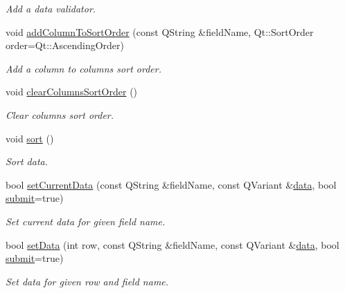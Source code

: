 \begin{DoxyCompactItemize}
\begin{DoxyCompactList}\small\item\em Add a data validator. \end{DoxyCompactList}\item 
void \hyperlink{classmdt_abstract_sql_table_controller_aa56e548973ffed3e01bd319bd7695101}{add\-Column\-To\-Sort\-Order} (const Q\-String \&field\-Name, Qt\-::\-Sort\-Order order=Qt\-::\-Ascending\-Order)
\begin{DoxyCompactList}\small\item\em Add a column to columns sort order. \end{DoxyCompactList}\item 
void \hyperlink{classmdt_abstract_sql_table_controller_a7dacbef8abf70112e2c8321722797939}{clear\-Columns\-Sort\-Order} ()
\begin{DoxyCompactList}\small\item\em Clear columns sort order. \end{DoxyCompactList}\item 
void \hyperlink{classmdt_abstract_sql_table_controller_a47b1eedbfc74c5d80649350f801ad46d}{sort} ()
\begin{DoxyCompactList}\small\item\em Sort data. \end{DoxyCompactList}\item 
bool \hyperlink{classmdt_abstract_sql_table_controller_a2e7ec06d9148018d5fbeb4451bfe0780}{set\-Current\-Data} (const Q\-String \&field\-Name, const Q\-Variant \&\hyperlink{classmdt_abstract_sql_table_controller_a1801a01c0ce073c2e389b20f58a3d3ff}{data}, bool \hyperlink{classmdt_abstract_sql_table_controller_a14f3e2a91fc30ca0e018944f4f95bc33}{submit}=true)
\begin{DoxyCompactList}\small\item\em Set current data for given field name. \end{DoxyCompactList}\item 
bool \hyperlink{classmdt_abstract_sql_table_controller_abe56526399b9d9b0ab68139539ec616c}{set\-Data} (int row, const Q\-String \&field\-Name, const Q\-Variant \&\hyperlink{classmdt_abstract_sql_table_controller_a1801a01c0ce073c2e389b20f58a3d3ff}{data}, bool \hyperlink{classmdt_abstract_sql_table_controller_a14f3e2a91fc30ca0e018944f4f95bc33}{submit}=true)
\begin{DoxyCompactList}\small\item\em Set data for given row and field name. \end{DoxyCompactList}\item 

\end{DoxyCompactItemize}
